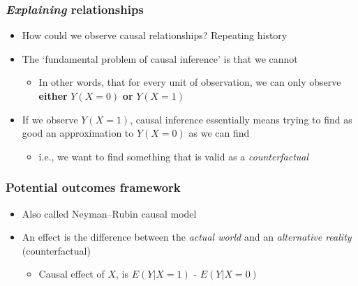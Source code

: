 \documentclass[aspectratio=43]{beamer}
\begin{document}
\begin{frame}
\frametitle{\textit{Explaining} relationships}
\centering

\begin{itemize}
  \item How could we observe causal relationships? Repeating history
  \item<2-> The `fundamental problem of causal inference' is that we cannot
  \begin{itemize}
    \item In other words, that for every unit of observation, we can only observe \textbf{either} $Y(X=0)$ \textbf{or} $Y(X=1)$
  \end{itemize}
  \item<3-> If we observe $Y(X=1)$, causal inference essentially means trying to find as good an approximation to $Y(X=0)$ as we can find
  \begin{itemize}
    \item i.e., we want to find something that is valid as a \textit{counterfactual}
  \end{itemize}
\end{itemize}

\end{frame}

\begin{frame}
\frametitle{Potential outcomes framework}
\centering

\begin{itemize}
  \item Also called Neyman–Rubin causal model
  \item An effect is the difference between the \textit{actual world} and an \textit{alternative reality} (counterfactual)
  \begin{itemize}
    \item Causal effect of $X$, is $E(Y|X = 1)$ - $E(Y|X = 0)$
  \end{itemize}
\end{itemize}

\end{frame}
\end{document}
